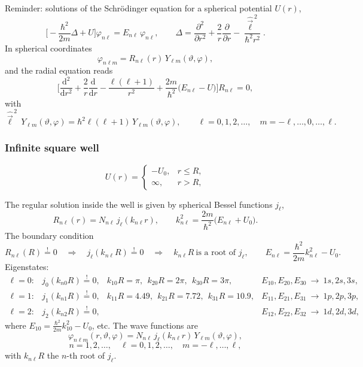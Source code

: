 \documentclass[11pt,a4paper]{article}
\newcommand{\op}[1]{\hat{#1}}
\newcommand{\ud}{\mathrm{d}}
\begin{document}
Reminder: solutions of the Schr\"odinger equation for a spherical potential $U(r)$,
\[
\Big[-\frac{\hbar^2}{2m}\Delta+U\Big]\varphi_{n\ell}=E_{n\ell}\,\varphi_{n\ell},
\qquad
\Delta=\frac{\partial^2}{\partial r^2}+\frac2r\frac{\partial}{\partial r}-\frac{\op{\vec\ell}^{\,2}}{\hbar^2r^2}.
\]
In spherical coordinates
\[
\varphi_{n\ell m}=R_{n\ell}(r)\,Y_{\ell m}(\vartheta,\varphi),
\]
and the radial equation reads
\[
\Big[\frac{\ud^2}{\ud r^2}+\frac2r\frac{\ud}{\ud r}-\frac{\ell(\ell+1)}{r^2}+\frac{2m}{\hbar^2}\big(E_{n\ell}-U\big)\Big]R_{n\ell}=0,
\]
with
\[
\op{\vec\ell}^{\,2}\,Y_{\ell m}(\vartheta,\varphi)=\hbar^2\ell(\ell+1)\,Y_{\ell m}(\vartheta,\varphi),
\qquad \ell=0,1,2,\dots,\quad m=-\ell,\dots,0,\dots,\ell .
\]

\subsubsection*{Infinite square well}
\[
U(r)=\begin{cases}-U_0, & r\le R,\\ \infty, & r>R,\end{cases}
\]
\begin{center}
\end{center}
The regular solution inside the well is given by spherical Bessel functions $j_\ell$,
\[
R_{n\ell}(r)=N_{n\ell}\,j_\ell(k_{n\ell}r),
\qquad
k_{n\ell}^2=\frac{2m}{\hbar^2}\big(E_{n\ell}+U_0\big).
\]
The boundary condition
\[
R_{n\ell}(R)\overset{!}{=}0\quad\Longrightarrow\quad j_\ell(k_{n\ell}R)\overset{!}{=}0
\quad\Longrightarrow\quad k_{n\ell}R\ \text{is a root of } j_\ell ,
\qquad
E_{n\ell}=\frac{\hbar^2}{2m}k_{n\ell}^2-U_0 .
\]
Eigenstates:
\[
\begin{array}{llll}
\ell=0: & j_0(k_{n0}R)\overset{!}{=}0, & k_{10}R=\pi,\ \ k_{20}R=2\pi,\ \ k_{30}R=3\pi, & E_{10},E_{20},E_{30}\ \to\ 1s,2s,3s,\\[1mm]
\ell=1: & j_1(k_{n1}R)\overset{!}{=}0, & k_{11}R=4.49,\ \ k_{21}R=7.72,\ \ k_{31}R=10.9, & E_{11},E_{21},E_{31}\ \to\ 1p,2p,3p,\\[1mm]
\ell=2: & j_2(k_{n2}R)\overset{!}{=}0, & & E_{12},E_{22},E_{32}\ \to\ 1d,2d,3d,
\end{array}
\]
where $E_{10}=\frac{\hbar^2}{2m}k_{10}^2-U_0$, etc.
The wave functions are
\[
\varphi_{n\ell m}(r,\vartheta,\varphi)=N_{n\ell}\,j_\ell(k_{n\ell}r)\,Y_{\ell m}(\vartheta,\varphi),
\]
\[
n=1,2,\dots,\quad \ell=0,1,2,\dots,\quad m=-\ell,\dots,\ell,
\]
with $k_{n\ell}R$ the $n$-th root of $j_\ell$.
\end{document}
